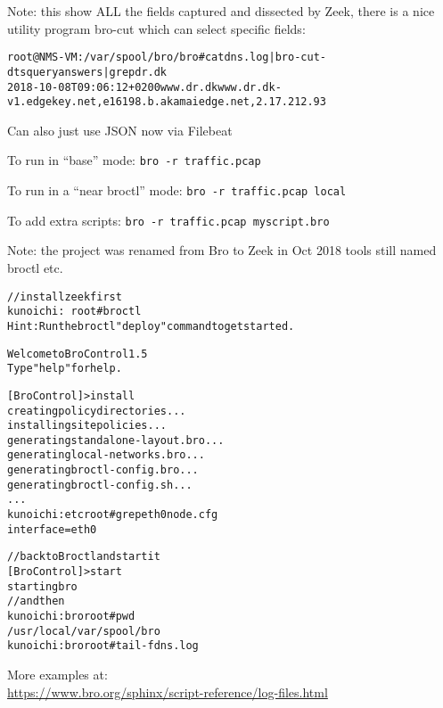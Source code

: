 \documentclass[Screen16to9,17pt]{foils}
\begin{document}
Note: this show ALL the fields captured and dissected by Zeek, there is a nice utility program bro-cut which can select specific fields:

\begin{alltt}\small
root@NMS-VM:/var/spool/bro/bro# cat dns.log | bro-cut -d ts query answers | grep dr.dk
2018-10-08T09:06:12+0200	www.dr.dk	www.dr.dk-v1.edgekey.net,e16198.b.akamaiedge.net,2.17.212.93
\end{alltt}

Can also just use JSON now via Filebeat



\begin{list1}
\item To run in “base” mode:
 \verb+bro -r traffic.pcap+
\item To run in a “near broctl” mode:
\verb+bro -r traffic.pcap local+
\item To add extra scripts:
\verb+bro -r traffic.pcap myscript.bro+
\end{list1}

\centerline{Note: the project was renamed from Bro to Zeek in Oct 2018 tools still named broctl etc.}


\begin{alltt}\small
// install zeek first
kunoichi:~ root# broctl
Hint: Run the broctl "deploy" command to get started.

Welcome to BroControl 1.5
Type "help" for help.

[BroControl] > install
creating policy directories ...
installing site policies ...
generating standalone-layout.bro ...
generating local-networks.bro ...
generating broctl-config.bro ...
generating broctl-config.sh ...
...
kunoichi:etc root# grep eth0 node.cfg
interface=eth0
\end{alltt}


\begin{alltt}\small
// back to Broctl and start it
[BroControl] > start
starting bro
// and then
kunoichi:bro root# pwd
/usr/local/var/spool/bro
kunoichi:bro root# tail -f dns.log
\end{alltt}

More examples at:\\
\url{https://www.bro.org/sphinx/script-reference/log-files.html}



\end{document}
